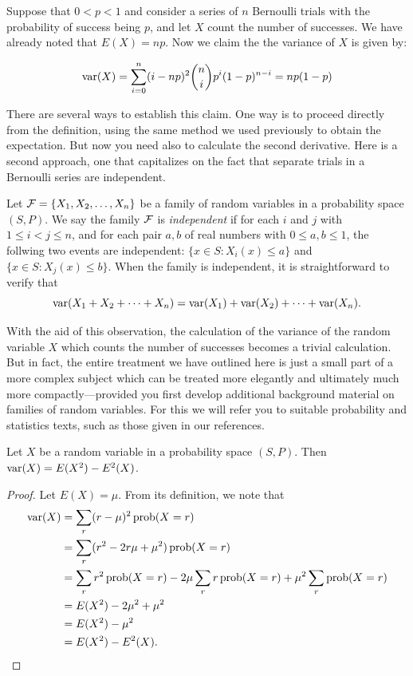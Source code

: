 \begin{example}
Suppose that $0<p<1$ and consider a series of $n$ Bernoulli trials with 
the probability of success being $p$, and let $X$ count the number of 
successes.  We have already noted that $E(X)=np$.  Now we claim the the 
variance of $X$ is given by:

\[
\operatorname{var}(X)=\sum_{i=0}^n (i-np)^2\binom{n}{i}p^i(1-p)^{n-i} = np(1-p)
\]

There are several ways to establish this claim.  One way is to proceed
directly from the definition, using the same method we used previously 
to obtain the expectation. But now you need also to calculate the second 
derivative.  Here is a second approach, one that capitalizes on the
fact that separate trials in a Bernoulli series are independent.

Let $\mathcal{F}=\{X_1,X_2,\dots,X_n\}$ be a family of random variables
in a probability space $(S,P)$.  We say the family $\mathcal{F}$ is
\textit{independent} if for each $i$ and $j$ with 
$1\le i<j\le n$, and for each pair $a,b$ of real numbers with
$0\le a,b\le 1$, the follwing two events are independent:
$\{x\in S: X_i(x)\le a\}$ and $\{x\in S:X_j(x)\le b\}$.  When
the family is independent, it is straightforward to verify that
\[
\operatorname{var}(X_1+X_2+\dots+X_n)=\operatorname{var}(X_1)+\operatorname{var}(X_2)+\dots+\operatorname{var}(X_n).
\]  

With the aid of this observation, the calculation of the variance of
the random variable $X$ which counts the number of successes becomes
a trivial calculation.  But in fact, the entire treatment we have outlined
here is just a small part of a more complex subject which
can be treated more elegantly and ultimately much more compactly---provided
you first develop additional background material on families of
random variables.   For this we will refer
you to suitable probability and statistics texts, such as those given
in our references.
\end{example}

\begin{proposition}\label{prop:altvar}
Let $X$ be a random variable in a probability space $(S,P)$.
Then $\operatorname{var}(X)= E(X^2)-E^2(X)$.
\end{proposition}
\begin{proof}
Let $E(X)=\mu$.  From its definition, we note that
\begin{align*}
 \operatorname{var}(X) &= \sum_{r} (r -\mu)^2\operatorname{prob}(X=r)\\
         &= \sum_{r} (r^2 -2r \mu+\mu^2)\operatorname{prob}(X=r)\\
         &= \sum_r r^2\operatorname{prob}(X=r) - 2 \mu\sum_r r\operatorname{prob}(X=r) +\mu^2\sum_r\operatorname{prob}(X=r)\\
         &= E(X^2) -2\mu^2+\mu^2\\
         &= E(X^2) - \mu^2\\
         &= E(X^2) - E^2(X).
\end{align*}
\end{proof}

